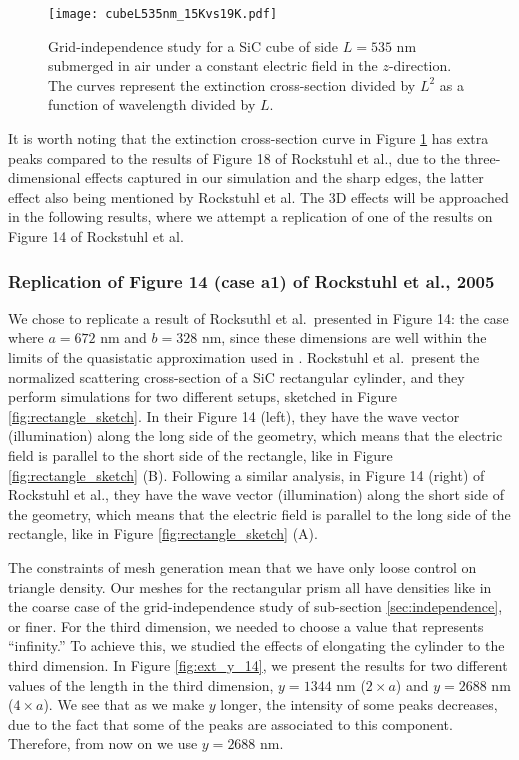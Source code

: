\begin{figure}
    \centering
    \texttt{[image: cubeL535nm\_15Kvs19K.pdf]} 
    \caption{Grid-independence study for a SiC cube of side $L=535$ nm submerged in air under a constant 
    electric field in the $z$-direction. The curves represent the extinction cross-section divided by $L^2$ 
    as a function of wavelength divided by $L$.}
    \label{fig:cube535}
 \end{figure}

It is worth noting that the extinction cross-section curve in Figure \ref{fig:cube535} has extra peaks 
compared to the results of Figure 18 of Rockstuhl et al., due to the three-dimensional effects captured in our simulation and the sharp 
edges, the latter effect also being mentioned by Rockstuhl et al. The 3D effects will be approached
in the following results, where we attempt a replication of one of the results on Figure 14 of Rockstuhl et al. 

\subsubsection{Replication of Figure 14 (case a1) of Rockstuhl et al., 2005}

We chose to replicate a result of Rocksuthl et al.\ presented in Figure 14: 
the case where $a=672$ nm 
and $b=328$ nm, since these dimensions are well within the limits of the quasistatic approximation 
used in \pygbe. Rockstuhl et al.\ present the normalized scattering cross-section of a SiC rectangular 
cylinder, and they perform simulations for two different setups, sketched in Figure \ref{fig:rectangle_sketch}. In 
their Figure 14 (left), they have the wave vector (illumination) along the long 
side of the geometry, which means that the electric field is parallel to the short side of the rectangle, like in 
Figure \ref{fig:rectangle_sketch} (B). Following a similar analysis, in Figure 14 (right) of Rockstuhl et al., they have the wave 
vector (illumination) along the short side of the geometry, which means that the electric field is parallel to the 
long side of the rectangle, like in Figure \ref{fig:rectangle_sketch} (A). 

The constraints of mesh generation mean that we have only loose control on triangle density. Our meshes for the rectangular prism all have densities like in the coarse case of the grid-independence study of sub-section \ref{sec:independence}, or finer.
For the third dimension, we needed to choose a value that represents ``infinity.'' To achieve this, we studied the effects of 
elongating the cylinder to the third dimension. In Figure \ref{fig:ext_y_14}, we present the results for two different
values of the length in the third dimension, $y=1344$ nm ($2\times a$) and $y=2688$ nm ($4\times a$). We see that as we make $y$ longer, the 
intensity of some peaks decreases, due to the fact that some of the peaks are associated to this component. Therefore, 
from now on we use $y=2688$ nm. 


